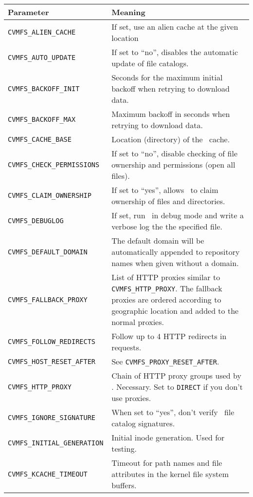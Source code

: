 	\begin{longtable}{lX}
		\toprule
		{\bf\centering Parameter} 			& {\bf\centering Meaning}\\
		\midrule
		\tt CVMFS\_ALIEN\_CACHE			& If set, use an alien cache at the given location\\
		\tt CVMFS\_AUTO\_UPDATE			& If set to ``no'', disables the automatic update of file catalogs.\\
		\tt CVMFS\_BACKOFF\_INIT			& Seconds for the maximum initial backoff when retrying to download data.\\ 
		\tt CVMFS\_BACKOFF\_MAX			& Maximum backoff in seconds when retrying to download data.\\
		\tt CVMFS\_CACHE\_BASE				& Location (directory) of the \cvmfs\ cache.\\
		\tt CVMFS\_CHECK\_PERMISSIONS		& If set to ``no'', disable checking of file ownership and permissions (open all files).\\
		\tt CVMFS\_CLAIM\_OWNERSHIP		& If set to ``yes'', allows \cvmfs\ to claim ownership of files and directories.\\
		\tt CVMFS\_DEBUGLOG				& If set, run \cvmfs\ in debug mode and write a verbose log the the specified file.\\
		\tt CVMFS\_DEFAULT\_DOMAIN			& The default domain will be automatically appended to repository names when given without a domain.\\
		\tt CVMFS\_FALLBACK\_PROXY		& List of HTTP proxies similar to \texttt{CVMFS\_HTTP\_PROXY}. The fallback proxies are ordered according to geographic location and added to the normal proxies.\\
		\tt CVMFS\_FOLLOW\_REDIRECTS		& Follow up to 4 HTTP redirects in requests.\\
		\tt CVMFS\_HOST\_RESET\_AFTER		& See \texttt{CVMFS\_PROXY\_RESET\_AFTER}.\\
		\tt CVMFS\_HTTP\_PROXY				& Chain of HTTP proxy groups used by \cvmfs. Necessary. Set to \texttt{DIRECT} if you don't use proxies.\\
		\tt CVMFS\_IGNORE\_SIGNATURE		& When set to ``yes'', don't verify \cvmfs\ file catalog signatures.\\
		\tt CVMFS\_INITIAL\_GENERATION		& Initial inode generation.  Used for testing.\\
		\tt CVMFS\_KCACHE\_TIMEOUT			& Timeout for path names and file attributes in the kernel file system buffers.\\

\end{longtable}
